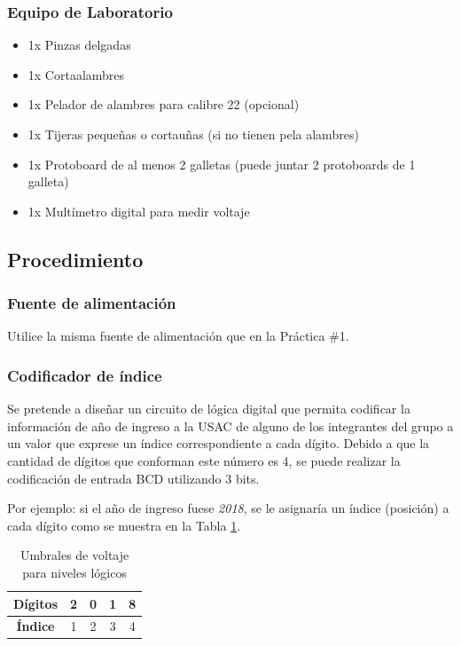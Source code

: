 \subsubsection*{Equipo de Laboratorio}
\begin{itemize}
    \item 1x Pinzas delgadas
    \item 1x Cortaalambres
    \item 1x Pelador de alambres para calibre 22 (opcional)
    \item 1x Tijeras pequeñas o cortauñas (si no tienen pela alambres)
    \item 1x Protoboard de al menos 2 galletas (puede juntar 2 protoboards de 1 galleta)
    \item 1x Multímetro digital para medir voltaje
\end{itemize}

\subsection{Procedimiento}
\subsubsection{Fuente de alimentación}
Utilice la misma fuente de alimentación que en la Práctica \#1.

\subsubsection{Codificador de índice}
Se pretende a diseñar un circuito de lógica digital que permita codificar la información de año de ingreso a la USAC de alguno de los
integrantes del grupo a un valor que exprese un índice correspondiente a cada dígito. Debido a que la cantidad de dígitos
que conforman este número es 4, se puede realizar la codificación de entrada BCD utilizando 3 bits.

\vspace{14pt}

Por ejemplo: si el año de ingreso fuese \emph{2018}, se le asignaría un índice (posición) a cada dígito como se
muestra en la Tabla \ref{Table:ejemploIndices}.

\begin{table}[H]
    \centering
    \begin{tabular}{|c|c|c|c|c|}
        \hline
        \textbf{Dígitos} & 2 & 0 & 1 & 8 \\ \hline
        \textbf{Índice}  & 1 & 2 & 3 & 4 \\ \hline
    \end{tabular}
    \caption{Umbrales de voltaje para niveles lógicos}
    \label{Table:ejemploIndices}
\end{table}


